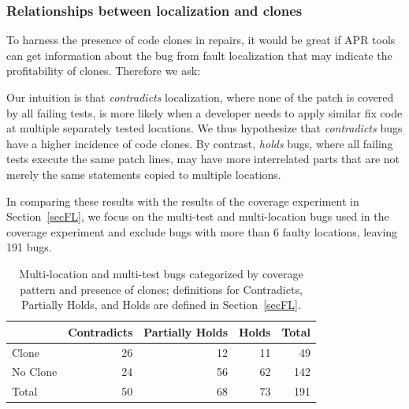 \documentclass[10pt, conference]{IEEEtran}
\begin{document}
\subsubsection{Relationships between localization and clones}

To harness the presence of code clones in repairs, it would be great if 
APR tools can get information about the bug from fault localization that 
may indicate the profitability of clones. 
Therefore we ask: 


Our intuition is that \emph{contradicts} localization, where none of the patch is 
covered by all failing tests, is more likely when a
developer needs to apply similar fix code at multiple separately tested locations. 
We thus hypothesize that \emph{contradicts} bugs have a higher incidence of code
clones. By contrast, \emph{holds} bugs, where all failing tests execute 
the same patch lines, may have
more interrelated parts that are not merely the same statements copied to
multiple locations.

In comparing these results with the results of the coverage experiment in
Section~\ref{secFL}, we focus on the multi-test and multi-location bugs used in the coverage 
experiment and exclude bugs with more than 6 faulty locations, leaving 191 bugs.

\begin{table}
  {\begin{center}
      \begin{tabular} {lrrrr}
        \toprule
        & Contradicts & Partially Holds & Holds & Total \\
        \midrule
        Clone & 26 & 12 & 11 &  49 \\
        No Clone  & 24 & 56 & 62 & 142 \\
        \midrule
        Total     & 50 & 68 & 73 & 191 \\
        \bottomrule
      \end{tabular}
    \end{center}
  }
  \caption{Multi-location and multi-test bugs categorized by coverage pattern
    and presence of clones; definitions for Contradicts, Partially Holds, and
    Holds are defined in Section~\ref{secFL}.}
  \label{tab:cov_clones}
\end{table}
\end{document}
